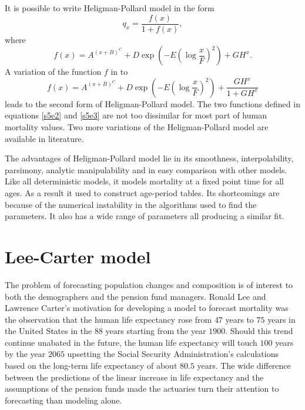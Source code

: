 \documentclass{article}
\numberwithin{equation}{section}
\begin{document}
It is possible to write Heligman-Pollard model in the form
\begin{equation}\label{s5e2}
q_x = \frac{f(x)}{1 + f(x)},
\end{equation}
where
\begin{equation}\label{s5e3}
f(x) = A^{(x+B)^C} + D\exp\left(-E\left(\log\frac{x}{F}\right)^2\right) + 
GH^x.
\end{equation}
A variation of the function $f$ in to
\begin{equation}\label{s5e4}
f(x) = A^{(x+B)^C} + D\exp\left(-E\left(\log\frac{x}{F}\right)^2\right) + 
\frac{GH^x}{1 + GH^x}
\end{equation}
leads to the second form of Heligman-Pollard model. The two functions defined
in equations \eqref{s5e2} and \eqref{s5e3} are not too dissimilar for most
part of human mortality values. Two more variations of the Heligman-Pollard
model are available in literature\cite{heligman1980age}.

The advantages of Heligman-Pollard model \cite{umar2019modeling} lie in its
smoothness, interpolability, parsimony, analytic manipulability and in 
easy comparison with other models. Like all deterministic models, it models
mortality at a fixed point time for all ages. As a result it used to construct
age-period tables. Its shortcomings are because of the numerical instability
in the algorithms used to find the parameters. It also has a wide range of
parameters all producing a similar fit.


\section{Lee-Carter model}\label{s6}
The problem of forecasting population changes and composition is of interest
to both the demographers and the pension fund managers. Ronald Lee and 
Lawrence Carter's motivation for developing a model to forecast mortality was
the observation that the human life expectancy rose from $47$ years to $75$ 
years in the United States in the $88$ years starting from the year $1900$.
Should this trend continue unabated in the future, the human life expectancy
will touch $100$ years by the year $2065$ upsetting the Social Security 
Administration's calculations based on the long-term life expectancy of about
$80.5$ years. The wide difference between the predictions of the linear 
increase in life expectancy 
\cite{lee1992modeling} and the assumptions of the pension funds 
made the actuaries turn their attention to forecasting than modeling alone.
\end{document}
